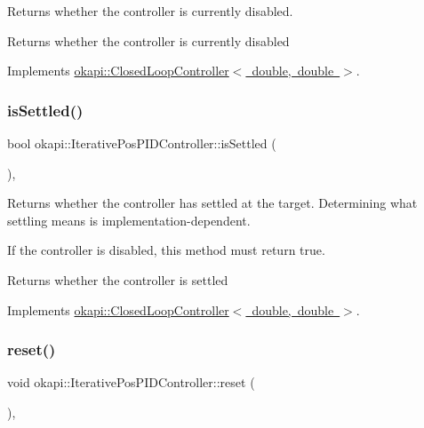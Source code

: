 Returns whether the controller is currently disabled.

\begin{DoxyReturn}{Returns}
whether the controller is currently disabled 
\end{DoxyReturn}


Implements \mbox{\hyperlink{classokapi_1_1ClosedLoopController_a40bd4ec2b8c75503fbf6f494fd7cbe69}{okapi\+::\+Closed\+Loop\+Controller$<$ double, double $>$}}.

\mbox{\label{classokapi_1_1IterativePosPIDController_a856b633717128607fa8f1b52d91f89d6}} 
\subsubsection{\texorpdfstring{isSettled()}{isSettled()}}
{\footnotesize\ttfamily bool okapi\+::\+Iterative\+Pos\+P\+I\+D\+Controller\+::is\+Settled (\begin{DoxyParamCaption}{ }\end{DoxyParamCaption})\hspace{0.3cm}{\ttfamily [override]}, {\ttfamily [virtual]}}

Returns whether the controller has settled at the target. Determining what settling means is implementation-\/dependent.

If the controller is disabled, this method must return true.

\begin{DoxyReturn}{Returns}
whether the controller is settled 
\end{DoxyReturn}


Implements \mbox{\hyperlink{classokapi_1_1ClosedLoopController_aed7aa0e94b6474c28314f8517d6cb4d8}{okapi\+::\+Closed\+Loop\+Controller$<$ double, double $>$}}.

\mbox{\label{classokapi_1_1IterativePosPIDController_a038da11f8e6e16139423e2284afa797c}} 
\subsubsection{\texorpdfstring{reset()}{reset()}}
{\footnotesize\ttfamily void okapi\+::\+Iterative\+Pos\+P\+I\+D\+Controller\+::reset (\begin{DoxyParamCaption}{ }\end{DoxyParamCaption})\hspace{0.3cm}{\ttfamily [override]}, {\ttfamily [virtual]}}

